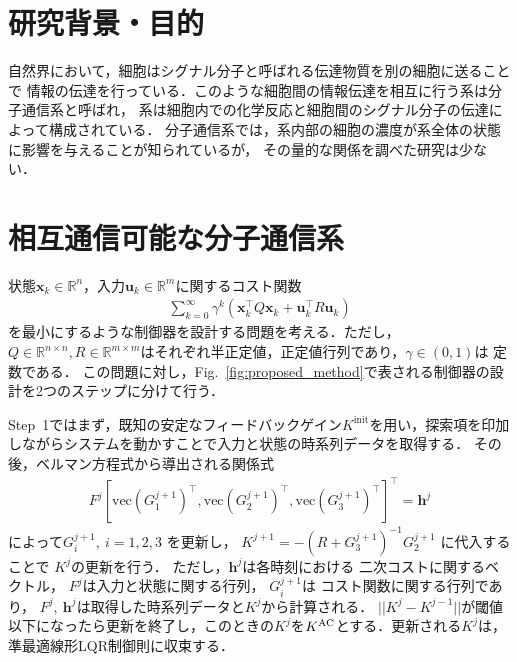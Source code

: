 \documentclass[twocolumn]{jarticle}
\newcommand{\rfig}[1]{Fig.~\ref{#1}}
\begin{document}
\maketitle

\section{研究背景・目的}
自然界において，細胞はシグナル分子と呼ばれる伝達物質を別の細胞に送ることで
情報の伝達を行っている．このような細胞間の情報伝達を相互に行う系は分子通信系と呼ばれ，
系は細胞内での化学反応と細胞間のシグナル分子の伝達によって構成されている．
分子通信系では，系内部の細胞の濃度が系全体の状態に影響を与えることが知られているが，
その量的な関係を調べた研究は少ない．


\section{相互通信可能な分子通信系}
状態$\bm{x}_{k} \in \mathbb{R}^{n}$，入力$\bm{u}_{k} \in \mathbb{R}^{m}$に関するコスト関数
\begin{align}
    \sum^{\infty}_{k=0} \gamma^{k} (\bm{x}_{k}^\top Q \bm{x}_{k} + \bm{u}_{k}^\top R \bm{u}_{k})
    \label{eq:cost_equation}
\end{align}
を最小にするような制御器を設計する問題を考える．ただし，$Q \in \mathbb{R}^{n \times n}, R \in \mathbb{R}^{m \times m}$はそれぞれ半正定値，正定値行列であり，$\gamma \in (0, 1)$は
定数である．
この問題に対し，\rfig{fig:proposed_method}で表される制御器の設計を2つのステップに分けて行う．

Step~1ではまず，既知の安定なフィードバックゲイン$K^{\mathrm{init}}$を用い，探索項を印加しながらシステムを動かすことで入力と状態の時系列データを取得する．
その後，ベルマン方程式から導出される関係式
\begin{align}
F ^j [\textrm{vec}(G^{j+1}_1)^\top ,\textrm{vec}(G^{j+1}_2)^\top ,\textrm{vec}(G^{j+1}_3)^\top]^\top=\bm{h}^j
\label{update_equation}
\end{align}
によって$G^{j+1}_i,~i=1,2,3$
を更新し，
$K^{j+1}=-(R+G_3^{j+1})^{-1}G_2^{j+1}$
に代入することで
$K^j$の更新を行う．
ただし，$\bm{h}^{j}$は各時刻における
二次コストに関するベクトル，
$F^{j}$は入力と状態に関する行列，
$G^{j+1}_i$は
コスト関数に関する行列であり，
$F^j,~ \bm{h}^j$は取得した時系列データと$K^j$から計算される．
$||K^j-K^{j-1}||$が閾値以下になったら更新を終了し，このときの$K^j$を$K^{\rm{AC}}$とする．更新される$K^{j}$は，準最適線形LQR制御則に収束する．
\end{document}
